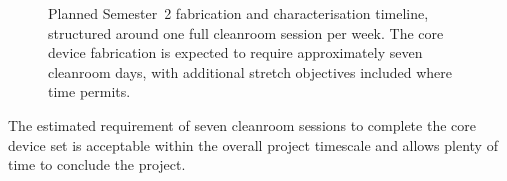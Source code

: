 \begin{figure}[htbp]
\caption{Planned Semester~2 fabrication and characterisation timeline,
structured around one full cleanroom session per week. The core device
fabrication is expected to require approximately seven cleanroom days,
with additional stretch objectives included where time permits.}
\label{fig:semester2_gantt}
\end{figure}

\vspace{2mm}

\FloatBarrier

The estimated requirement of seven cleanroom sessions to complete the
core device set is acceptable within the overall project timescale and 
allows plenty of time to conclude the project.

